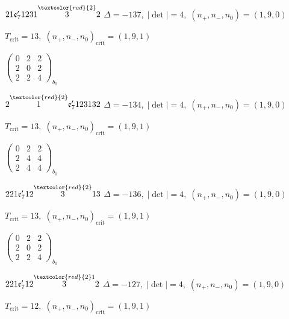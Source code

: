 \documentclass[10pt]{article}
\begin{document}
\smallskip

$21\mathfrak{e}_7'1231\overset{\textcolor{red}{2}}{3}2$ \quad $\Delta=-137,\; |\det|=4,\; (n_+,n_-,n_0)=(1,9,0)$

\hspace{1em}$T_{\text{crit}}=13,\; (n_+,n_-,n_0)_{\text{crit}}=(1,9,1)$

\hspace{2em}$\left(\begin{smallmatrix}0 & 2 & 2 \\ 2 & 0 & 2 \\ 2 & 2 & 4\end{smallmatrix}\right)_{\!b_0}$

$2\overset{\textcolor{red}{2}}{1}\mathfrak{e}_7'123132$ \quad $\Delta=-134,\; |\det|=4,\; (n_+,n_-,n_0)=(1,9,0)$

\hspace{1em}$T_{\text{crit}}=13,\; (n_+,n_-,n_0)_{\text{crit}}=(1,9,1)$

\hspace{2em}$\left(\begin{smallmatrix}0 & 2 & 2 \\ 2 & 4 & 4 \\ 2 & 4 & 4\end{smallmatrix}\right)_{\!b_0}$

\smallskip

$221\mathfrak{e}_7'12\overset{\textcolor{red}{2}}{3}13$ \quad $\Delta=-136,\; |\det|=4,\; (n_+,n_-,n_0)=(1,9,0)$

\hspace{1em}$T_{\text{crit}}=13,\; (n_+,n_-,n_0)_{\text{crit}}=(1,9,1)$

\hspace{2em}$\left(\begin{smallmatrix}0 & 2 & 2 \\ 2 & 0 & 2 \\ 2 & 2 & 4\end{smallmatrix}\right)_{\!b_0}$

\smallskip

$221\mathfrak{e}_7'12\overset{\textcolor{red}{2}1}{3}2$ \quad $\Delta=-127,\; |\det|=4,\; (n_+,n_-,n_0)=(1,9,0)$

\hspace{1em}$T_{\text{crit}}=12,\; (n_+,n_-,n_0)_{\text{crit}}=(1,9,1)$
\end{document}
